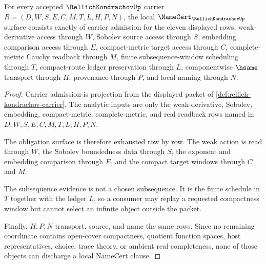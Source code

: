 \begin{theorem}
\label{thm:rellich-kondrachov-namecert-obligations}
For every accepted $\RellichKondrachovUp$ carrier $R=(D,W,S,E,C,M,T,L,H,P,N)$, the local $\NameCert_{\RellichKondrachovUp}$ surface consists exactly of carrier admission for the eleven displayed rows, weak-derivative access through $W$, Sobolev source access through $S$, embedding comparison access through $E$, compact-metric target access through $C$, complete-metric Cauchy readback through $M$, finite subsequence-window scheduling through $T$, compact-route ledger preservation through $L$, componentwise $\hsame$ transport through $H$, provenance through $P$, and local naming through $N$.
\end{theorem}
\begin{proof}
Carrier admission is projection from the displayed packet of \autoref{def:rellich-kondrachov-carrier}. The analytic inputs are only the weak-derivative, Sobolev, embedding, compact-metric, complete-metric, and real readback rows named in $D,W,S,E,C,M,T,L,H,P,N$.

The obligation surface is therefore exhausted row by row. The weak action is read through $W$, the Sobolev boundedness data through $S$, the exponent and embedding comparison through $E$, and the compact target windows through $C$ and $M$.

The subsequence evidence is not a chosen subsequence. It is the finite schedule in $T$ together with the ledger $L$, so a consumer may replay a requested compactness window but cannot select an infinite object outside the packet.

Finally, $H,P,N$ transport, source, and name the same rows. Since no remaining coordinate contains open-cover compactness, quotient function spaces, host representatives, choice, trace theory, or ambient real completeness, none of those objects can discharge a local NameCert clause.
\end{proof}

